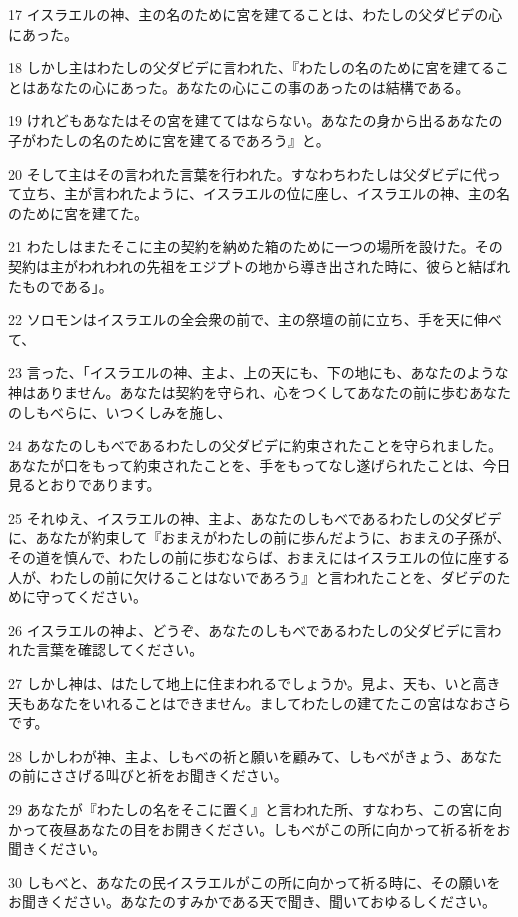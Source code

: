 \par 17 イスラエルの神、主の名のために宮を建てることは、わたしの父ダビデの心にあった。
\par 18 しかし主はわたしの父ダビデに言われた、『わたしの名のために宮を建てることはあなたの心にあった。あなたの心にこの事のあったのは結構である。
\par 19 けれどもあなたはその宮を建ててはならない。あなたの身から出るあなたの子がわたしの名のために宮を建てるであろう』と。
\par 20 そして主はその言われた言葉を行われた。すなわちわたしは父ダビデに代って立ち、主が言われたように、イスラエルの位に座し、イスラエルの神、主の名のために宮を建てた。
\par 21 わたしはまたそこに主の契約を納めた箱のために一つの場所を設けた。その契約は主がわれわれの先祖をエジプトの地から導き出された時に、彼らと結ばれたものである」。
\par 22 ソロモンはイスラエルの全会衆の前で、主の祭壇の前に立ち、手を天に伸べて、
\par 23 言った、「イスラエルの神、主よ、上の天にも、下の地にも、あなたのような神はありません。あなたは契約を守られ、心をつくしてあなたの前に歩むあなたのしもべらに、いつくしみを施し、
\par 24 あなたのしもべであるわたしの父ダビデに約束されたことを守られました。あなたが口をもって約束されたことを、手をもってなし遂げられたことは、今日見るとおりであります。
\par 25 それゆえ、イスラエルの神、主よ、あなたのしもべであるわたしの父ダビデに、あなたが約束して『おまえがわたしの前に歩んだように、おまえの子孫が、その道を慎んで、わたしの前に歩むならば、おまえにはイスラエルの位に座する人が、わたしの前に欠けることはないであろう』と言われたことを、ダビデのために守ってください。
\par 26 イスラエルの神よ、どうぞ、あなたのしもべであるわたしの父ダビデに言われた言葉を確認してください。
\par 27 しかし神は、はたして地上に住まわれるでしょうか。見よ、天も、いと高き天もあなたをいれることはできません。ましてわたしの建てたこの宮はなおさらです。
\par 28 しかしわが神、主よ、しもべの祈と願いを顧みて、しもべがきょう、あなたの前にささげる叫びと祈をお聞きください。
\par 29 あなたが『わたしの名をそこに置く』と言われた所、すなわち、この宮に向かって夜昼あなたの目をお開きください。しもべがこの所に向かって祈る祈をお聞きください。
\par 30 しもべと、あなたの民イスラエルがこの所に向かって祈る時に、その願いをお聞きください。あなたのすみかである天で聞き、聞いておゆるしください。
